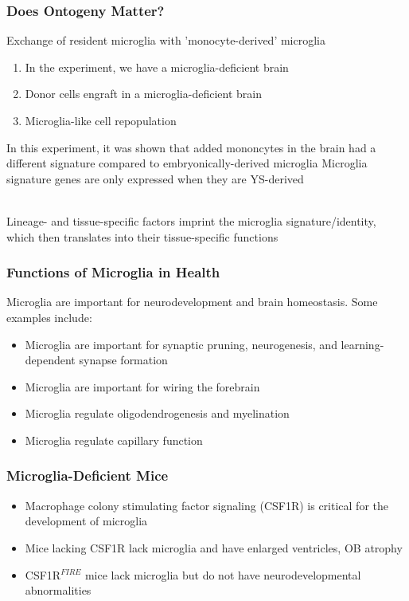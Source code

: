 \begin{itemize}
\begin{itemize}
\subsubsection{Does Ontogeny Matter?}
Exchange of resident microglia with 'monocyte-derived' microglia
\begin{enumerate}
      \item In the experiment, we have a microglia-deficient brain
      \item Donor cells engraft in a microglia-deficient
brain
      \item Microglia-like cell repopulation
\end{enumerate}
In this experiment, it was shown that added mononcytes in the brain had a different signature compared to embryonically-derived microglia
Microglia signature genes are only expressed when they are YS-derived

\\Lineage- and tissue-specific factors imprint the microglia signature/identity,
which then translates into their tissue-specific functions

\subsubsection{Functions of Microglia in Health}
Microglia are important for neurodevelopment and brain homeostasis. Some examples include:
\begin{itemize}
    \item Microglia are important for synaptic pruning, neurogenesis, and learning-dependent synapse formation
    \item Microglia are important for wiring the forebrain
    \item Microglia regulate oligodendrogenesis and myelination
    \item Microglia regulate capillary function
\end{itemize}
\subsubsection{Microglia-Deficient Mice}
\begin{itemize}
    \item Macrophage colony stimulating factor signaling (CSF1R) is critical for the development of microglia

\item Mice lacking CSF1R lack microglia and have enlarged ventricles, OB atrophy
\item CSF1R$^{FIRE}$ mice lack microglia but do not have neurodevelopmental abnormalities
\end{itemize}


\end{itemize}
\end{itemize}
